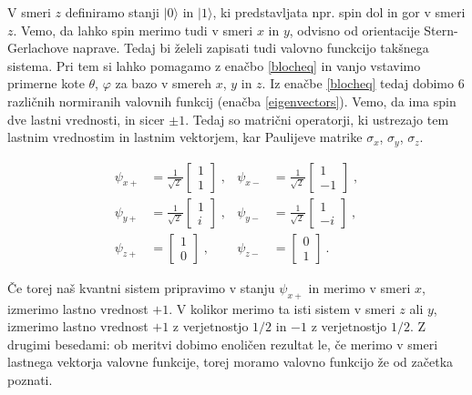 \documentclass[12pt]{article}
\begin{document}
V smeri $z$ definiramo stanji $| 0 \rangle$ in $| 1 \rangle$, ki predstavljata npr. spin dol in gor v smeri $z$. Vemo, da lahko spin merimo tudi v smeri $x$ in $y$, odvisno od orientacije Stern-Gerlachove naprave. Tedaj bi želeli zapisati tudi valovno funckcijo takšnega sistema. Pri tem si lahko pomagamo z enačbo \ref{blocheq} in vanjo vstavimo primerne kote $\theta$, $\varphi$ za bazo v smereh $x$, $y$ in $z$. Iz enačbe \ref{blocheq} tedaj dobimo 6 različnih normiranih valovnih funkcij (enačba \ref{eigenvectors}). Vemo, da ima spin dve lastni vrednosti, in sicer $\pm 1$. Tedaj so matrični operatorji, ki ustrezajo tem lastnim vrednostim in lastnim vektorjem, kar Paulijeve matrike $\sigma_x$, $\sigma_y$, $\sigma_z$. \cite{PauliMatrices2023}

\begin{equation}
\label{eigenvectors}
{\displaystyle {\begin{aligned}\psi _{x+}&={\frac {1}{\sqrt {2\,}}}{\begin{bmatrix}1\\1\end{bmatrix}}\;,&\psi _{x-}&={\frac {1}{\sqrt {2\,}}}{\begin{bmatrix}1\\-1\end{bmatrix}}\;,\\\psi _{y+}&={\frac {1}{\sqrt {2\,}}}{\begin{bmatrix}1\\i\end{bmatrix}}\;,&\psi _{y-}&={\frac {1}{\sqrt {2\,}}}{\begin{bmatrix}1\\-i\end{bmatrix}}\;,\\\psi _{z+}&={\begin{bmatrix}1\\0\end{bmatrix}}\;,&\psi _{z-}&={\begin{bmatrix}0\\1\end{bmatrix}}~.\end{aligned}}}
\end{equation}

\par Če torej naš kvantni sistem pripravimo v stanju $\psi_{x+}$ in merimo v smeri $x$, izmerimo lastno vrednost $+1$. V kolikor merimo ta isti sistem v smeri $z$ ali $y$, izmerimo lastno vrednost $+1$ z verjetnostjo $1/2$ in $-1$ z verjetnostjo $1/2$. Z drugimi besedami: ob meritvi dobimo enoličen rezultat le, če merimo v smeri lastnega vektorja valovne funkcije, torej moramo valovno funkcijo že od začetka poznati. 
\end{document}
